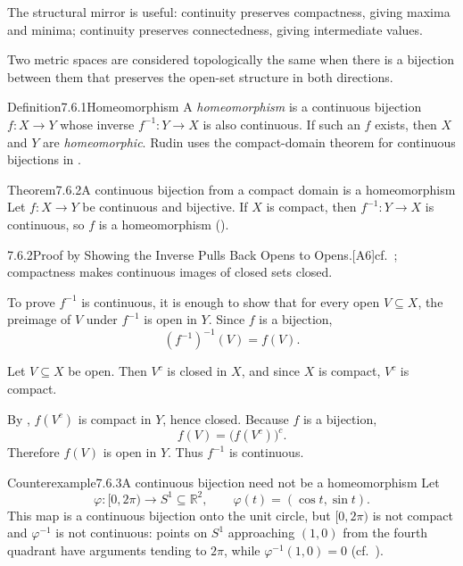 \documentclass[main.tex]{subfiles}
\begin{document}
\noindent The structural mirror is useful: continuity preserves compactness, giving maxima and
minima; continuity preserves connectedness, giving intermediate values.


\noindent Two metric spaces are considered topologically the same when there is a bijection between
them that preserves the open-set structure in both directions.

\begin{Obj}{Definition}{7.6.1}{Homeomorphism}
A \emph{homeomorphism} is a continuous bijection $f:X\to Y$ whose inverse
$f^{-1}:Y\to X$ is also continuous. If such an $f$ exists, then $X$ and $Y$ are
\emph{homeomorphic}. Rudin uses the compact-domain theorem for continuous bijections in
.
\end{Obj}

\begin{Obj}{Theorem}{7.6.2}{A continuous bijection from a compact domain is a homeomorphism}
Let $f:X\to Y$ be continuous and bijective. If $X$ is compact, then $f^{-1}:Y\to X$ is
continuous, so $f$ is a homeomorphism ().
\end{Obj}
\begin{Prf}{7.6.2}{Proof by Showing the Inverse Pulls Back Opens to Opens.}{[A6]\quad cf.\ ; compactness makes continuous images of closed sets closed.}
\item To prove $f^{-1}$ is continuous, it is enough to show that for every open
  $V\subseteq X$, the preimage of $V$ under $f^{-1}$ is open in $Y$. Since $f$ is a bijection,
  \[
    (f^{-1})^{-1}(V)=f(V).
  \]
\item Let $V\subseteq X$ be open. Then $V^c$ is closed in $X$, and since $X$ is compact,
  $V^c$ is compact.
\item By , $f(V^c)$ is compact in $Y$, hence closed. Because $f$ is a bijection,
  \[
    f(V)=\bigl(f(V^c)\bigr)^c .
  \]
  Therefore $f(V)$ is open in $Y$. Thus $f^{-1}$ is continuous.
\end{Prf}

\begin{Obj}{Counterexample}{7.6.3}{A continuous bijection need not be a homeomorphism}
Let
\[
  \varphi:[0,2\pi)\to S^1\subseteq\mathbb R^2,
  \qquad
  \varphi(t)=(\cos t,\sin t).
\]
This map is a continuous bijection onto the unit circle, but $[0,2\pi)$ is not compact and
$\varphi^{-1}$ is not continuous: points on $S^1$ approaching $(1,0)$ from the fourth quadrant
have arguments tending to $2\pi$, while $\varphi^{-1}(1,0)=0$ (cf.\ ).
\end{Obj}
\end{document}
